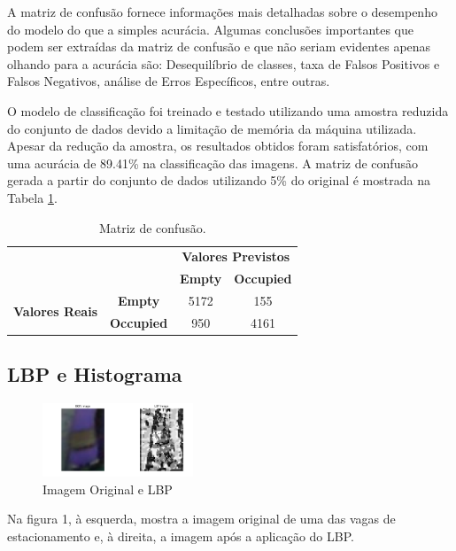 \documentclass[lettersize,journal]{IEEEtran}
\begin{document}
A matriz de confusão fornece informações mais detalhadas sobre o desempenho do modelo do que a simples acurácia. Algumas conclusões importantes que podem ser extraídas da matriz de confusão e que não seriam evidentes apenas olhando para a acurácia são: Desequilíbrio de classes, taxa de Falsos Positivos e Falsos Negativos, análise de Erros Específicos, entre outras.


O modelo de classificação foi treinado e testado utilizando uma amostra reduzida do conjunto de dados devido a limitação de memória da máquina utilizada. Apesar da redução da amostra, os resultados obtidos foram satisfatórios, com uma acurácia de 89.41\% na classificação das imagens. A matriz de confusão gerada a partir do conjunto de dados utilizando 5\% do original é mostrada na Tabela \ref{tab:confusion_matrix}.

\begin{table}[htbp]
    \centering
    \begin{tabular}{cc|c|c|}
        \cline{3-4}
        & & \multicolumn{2}{c|}{\textbf{Valores Previstos}} \\ \cline{3-4} 
        & & \textbf{Empty} & \textbf{Occupied} \\ \hline
        \multicolumn{1}{|c|}{\multirow{2}{*}{\textbf{Valores Reais}}} & \textbf{Empty} & 5172 & 155 \\ \cline{2-4} 
        \multicolumn{1}{|c|}{} & \textbf{Occupied} & 950 & 4161 \\ \hline
    \end{tabular}\vspace{5pt}
    \caption{Matriz de confusão.}
    \label{tab:confusion_matrix}
\end{table}

\subsection{LBP e Histograma}

\begin{figure}[h]
    \centering
    \includegraphics[width=0.4\textwidth]{LBP_Image.png}
    \caption{Imagem Original e LBP}
\end{figure}

Na figura 1, à esquerda, mostra a imagem original de uma das vagas de estacionamento e, à direita, a imagem após a aplicação do LBP.
\end{document}
